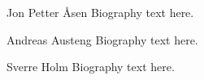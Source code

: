 \documentclass[journal]{IEEEtran}
\begin{document}
% 


\begin{IEEEbiography}{Jon Petter \AA{}sen}
Biography text here.
\end{IEEEbiography}



\begin{IEEEbiography}{Andreas Austeng}
Biography text here.
\end{IEEEbiography}

\begin{IEEEbiography}{Sverre Holm}
Biography text here.
\end{IEEEbiography}







\end{document}
